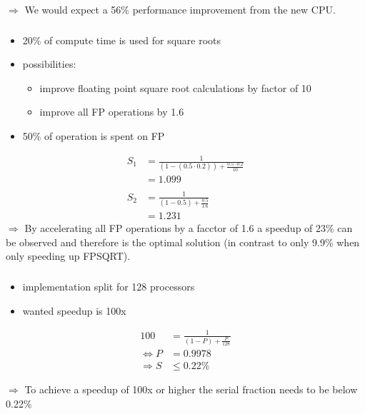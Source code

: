 \documentclass[]{scrartcl}
\begin{document}
$\Rightarrow$ We would expect a 56\% performance improvement from the new CPU\@.

\subsubsection{}
\begin{itemize}
    \item 20\% of compute time is used for square roots
    \item possibilities:
        \begin{itemize}
            \item improve floating point square root calculations by factor of 10
            \item improve all FP operations by 1.6
        \end{itemize}
    \item 50\% of operation is spent on FP
\end{itemize}
\begin{align}
    S_1 &= \frac{1}{(1-(0.5\cdot 0.2))+\frac{0.5\cdot0.2}{10}}\\
        &= 1.099\\\nonumber\\
    S_2 &= \frac{1}{(1-0.5)+\frac{0.5}{1.6}}\\
        &= 1.231
\end{align}
$\Rightarrow$ By accelerating all FP operations by a facctor of 1.6 a speedup of 23\% can be observed and therefore is the optimal solution (in contrast to only 9.9\% when only speeding up FPSQRT).

\subsubsection{}
\begin{itemize}
    \item implementation split for 128 processors
    \item wanted speedup is 100x
\end{itemize}
\begin{align}
    100 &= \frac{1}{(1-P)+\frac{P}{128}}\\
    \Leftrightarrow P&= 0.9978\\
    \Rightarrow S &\leq 0.22\%
\end{align}

$\Rightarrow$ To achieve a speedup of 100x or higher the serial fraction needs to be below 0.22\%
\end{document}
